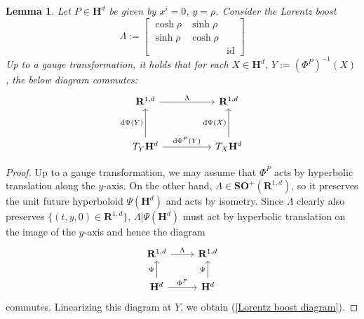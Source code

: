 \documentclass[reqno,11pt]{amsart}
\newcommand{\RR}{\mathbf{R}}
\newcommand{\Hyp}{\mathbf H}
\newcommand{\SpOrth}{\mathbf{SO}}
\DeclareMathOperator{\id}{id}
\newcommand*\dif{\mathop{}\!\mathrm{d}}
\newtheorem{lemma}[theorem]{Lemma}
\theoremstyle{definition}
\numberwithin{equation}{section}
\begin{document}
\begin{lemma}
Let $P \in \Hyp^d$ be given by $x^i = 0$, $y = \rho$. Consider the Lorentz boost
$$\Lambda := \begin{bmatrix}\cosh \rho & \sinh \rho \\ \sinh \rho & \cosh \rho \\ &&\id\end{bmatrix}$$
Up to a gauge transformation, it holds that for each $X \in \Hyp^d$, $Y := (\Phi^P)^{-1}(X)$, the below diagram commutes:
\begin{equation}\label{Lorentz boost diagram}
\begin{tikzcd}[column sep=50pt, row sep=30pt]
\RR^{1, d} \arrow[r, "\Lambda"] & \RR^{1, d} \\
T_Y \Hyp^d \arrow[u, "\dif \Psi(Y)"] \arrow[r, "\dif \Phi^P(Y)"] & T_X \Hyp^d \arrow[u, "\dif \Psi(X)"]
\end{tikzcd}
\end{equation}
\end{lemma}
\begin{proof}
Up to a gauge transformation, we may assume that $\Phi^P$ acts by hyperbolic translation along the $y$-axis.
On the other hand, $\Lambda \in \SpOrth^+(\RR^{1, d})$, so it preserves the unit future hyperboloid $\Psi(\Hyp^d)$ and acts by isometry.
Since $\Lambda$ clearly also preserves $\{(t, y, 0) \in \RR^{1, d}\}$, $\Lambda|\Psi(\Hyp^d)$ must act by hyperbolic translation on the image of the $y$-axis and hence the diagram
$$
\begin{tikzcd}
\RR^{1, d} \arrow[r, "\Lambda"] & \RR^{1, d} \\
\Hyp^d \arrow[u, "\Psi"] \arrow[r, "\Phi^P"] & \Hyp^d \arrow[u, "\Psi"]
\end{tikzcd}
$$
commutes. Linearizing this diagram at $Y$, we obtain (\ref{Lorentz boost diagram}).
\end{proof}
\end{document}
